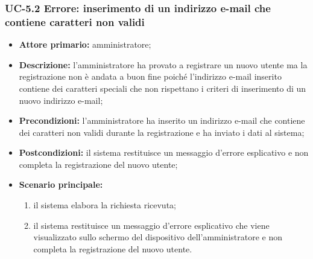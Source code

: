 \subsubsection{UC-5.2 Errore: inserimento di un indirizzo e-mail che contiene caratteri non validi}
\begin{itemize}
	\item \textbf{Attore primario:} amministratore;

	\item \textbf{Descrizione:} l'amministratore ha provato a registrare un nuovo utente ma la registrazione non è andata a buon fine poiché l'indirizzo e-mail inserito contiene dei caratteri speciali che non rispettano i criteri di inserimento di un nuovo indirizzo e-mail;

	\item \textbf{Precondizioni:} l'amministratore ha inserito un indirizzo e-mail che contiene dei caratteri non validi durante la registrazione e ha inviato i dati al sistema;

	\item \textbf{Postcondizioni:} il sistema restituisce un messaggio d'errore esplicativo e non completa la registrazione del nuovo utente;

	\item \textbf{Scenario principale:}
	      \begin{enumerate}
		      \item il sistema elabora la richiesta ricevuta;
		      \item il sistema restituisce un messaggio d'errore esplicativo che viene visualizzato sullo schermo del dispositivo dell'amministratore e non completa la registrazione del nuovo utente.
	      \end{enumerate}
\end{itemize}


